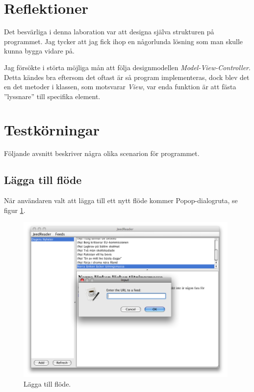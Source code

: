 \documentclass[titlepage, twoside, a4paper, 12pt]{article}
\begin{document}
\section{Reflektioner}\label{Reflektioner}

Det besvärliga i denna laboration var att designa själva strukturen på
programmet. Jag tycker att jag fick ihop en någorlunda lösning som man
skulle kunna bygga vidare på.

Jag försökte i störta möjliga mån att följa designmodellen
\textit{Model-View-Controller}. Detta kändes bra eftersom det oftast
är så program implementeras, dock blev det en det metoder i klassen,
som motsvarar \textit{View}, var enda funktion är att fästa
''lyssnare'' till specifika element.

\section{Testkörningar}\label{Testkorningar}

Följande avsnitt beskriver några olika scenarion för programmet.

\subsection{Lägga till flöde}
När användaren valt att lägga till ett nytt flöde kommer
Popop-dialogruta, se figur \ref{fig:add-feed}.

\begin{figure}[!hbp]
  \begin{center}
    \includegraphics[width=110mm]{images/add-feed.png}
    \caption{Lägga till flöde.}
    \label{fig:add-feed}
  \end{center}
\end{figure}
\end{document}
